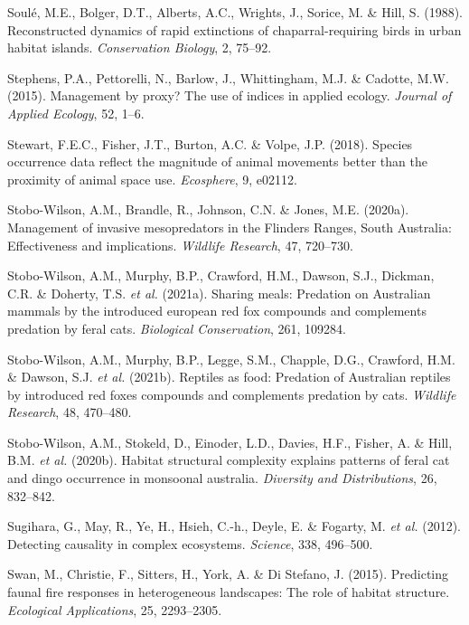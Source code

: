 \documentclass[11pt,a4paper,titlepage,twoside,openright]{style/unimelbthesis}
\begin{document}
\begin{mainmatter}
\leavevmode\hypertarget{ref-soule1988reconstructed}{}%
Soulé, M.E., Bolger, D.T., Alberts, A.C., Wrights, J., Sorice, M. \& Hill, S. (1988). Reconstructed dynamics of rapid extinctions of chaparral-requiring birds in urban habitat islands. \emph{Conservation Biology}, 2, 75--92.

\leavevmode\hypertarget{ref-stephens2015management}{}%
Stephens, P.A., Pettorelli, N., Barlow, J., Whittingham, M.J. \& Cadotte, M.W. (2015). Management by proxy? The use of indices in applied ecology. \emph{Journal of Applied Ecology}, 52, 1--6.

\leavevmode\hypertarget{ref-stewart2018species}{}%
Stewart, F.E.C., Fisher, J.T., Burton, A.C. \& Volpe, J.P. (2018). Species occurrence data reflect the magnitude of animal movements better than the proximity of animal space use. \emph{Ecosphere}, 9, e02112.

\leavevmode\hypertarget{ref-stobo2020management}{}%
Stobo-Wilson, A.M., Brandle, R., Johnson, C.N. \& Jones, M.E. (2020a). Management of invasive mesopredators in the Flinders Ranges, South Australia: Effectiveness and implications. \emph{Wildlife Research}, 47, 720--730.

\leavevmode\hypertarget{ref-stobo2021sharing}{}%
Stobo-Wilson, A.M., Murphy, B.P., Crawford, H.M., Dawson, S.J., Dickman, C.R. \& Doherty, T.S. \emph{et al.} (2021a). Sharing meals: Predation on Australian mammals by the introduced european red fox compounds and complements predation by feral cats. \emph{Biological Conservation}, 261, 109284.

\leavevmode\hypertarget{ref-stobo2021reptiles}{}%
Stobo-Wilson, A.M., Murphy, B.P., Legge, S.M., Chapple, D.G., Crawford, H.M. \& Dawson, S.J. \emph{et al.} (2021b). Reptiles as food: Predation of Australian reptiles by introduced red foxes compounds and complements predation by cats. \emph{Wildlife Research}, 48, 470--480.

\leavevmode\hypertarget{ref-stobo2020habitat}{}%
Stobo-Wilson, A.M., Stokeld, D., Einoder, L.D., Davies, H.F., Fisher, A. \& Hill, B.M. \emph{et al.} (2020b). Habitat structural complexity explains patterns of feral cat and dingo occurrence in monsoonal australia. \emph{Diversity and Distributions}, 26, 832--842.

\leavevmode\hypertarget{ref-sugihara2012detecting}{}%
Sugihara, G., May, R., Ye, H., Hsieh, C.-h., Deyle, E. \& Fogarty, M. \emph{et al.} (2012). Detecting causality in complex ecosystems. \emph{Science}, 338, 496--500.

\leavevmode\hypertarget{ref-swan2015predicting}{}%
Swan, M., Christie, F., Sitters, H., York, A. \& Di Stefano, J. (2015). Predicting faunal fire responses in heterogeneous landscapes: The role of habitat structure. \emph{Ecological Applications}, 25, 2293--2305.


\end{mainmatter}
\end{document}

